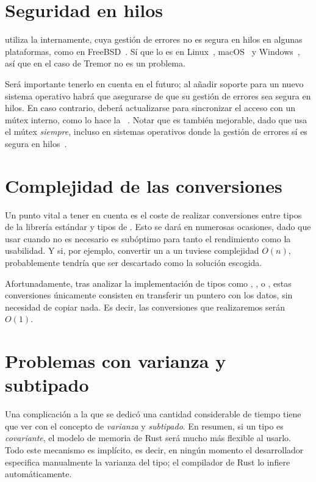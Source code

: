 \section{Seguridad en hilos}

\abistable utiliza la \crate {} internamente, cuya gestión
de errores no es segura en hilos en algunas plataformas, como  en
FreeBSD~\cite{thsafe_libloading}\cite{thsafe_openbsd}. Sí que lo es en
Linux~\cite{thsafe_linux}, macOS~\cite{thsafe_macos} y Windows~\cite{thsafe_ms},
así que en el caso de Tremor no es un problema.

Será importante tenerlo en cuenta en el futuro; al añadir soporte para un nuevo
sistema operativo habrá que asegurarse de que su gestión de errores sea segura
en hilos. En caso contrario, deberá actualizarse  para
sincronizar el acceso con un mútex interno, como lo hace la \crate
{}~\cite{thsafe_dlopen}. Notar que  es también
mejorable, dado que usa el mútex \emph{siempre}, incluso en sistemas operativos
donde la gestión de errores sí es segura en hilos~\cite{thsafe_dlopen_issue}.

\section{Complejidad de las conversiones}\label{abiperf}

Un punto vital a tener en cuenta es el coste de realizar conversiones entre
tipos de la librería estándar y tipos de \abistable. Esto se dará en numerosas
ocasiones, dado que usar \abistable cuando no es necesario es subóptimo para
tanto el rendimiento como la usabilidad. Y si, por ejemplo, convertir un
 a un  tuviese complejidad $O(n)$, probablemente
\abistable tendría que ser descartado como la solución escogida.

Afortunadamente, tras analizar la implementación de tipos como ,
,  o , estas conversiones únicamente
consisten en transferir un puntero con los datos, sin necesidad de copiar nada.
Es decir, las conversiones que realizaremos serán $O(1)$.

\section{Problemas con varianza y subtipado}

Una complicación a la que se dedicó una cantidad considerable de tiempo tiene
que ver con el concepto de \emph{varianza} y \emph{subtipado}. En resumen, si un
tipo es \emph{covariante}, el modelo de memoria de Rust será mucho más flexible
al usarlo. Todo este mecanismo es implícito, es decir, en ningún momento el
desarrollador especifica manualmente la varianza del tipo; el compilador de Rust
lo infiere automáticamente.

